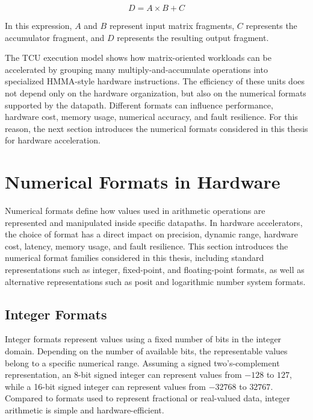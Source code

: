 \begin{equation}
D = A \times B + C
\label{eq:HMMA_mma}
\end{equation}

In this expression, $A$ and $B$ represent input matrix fragments, $C$ represents the accumulator fragment, and $D$ represents the resulting output fragment.

The TCU execution model shows how matrix-oriented workloads can be accelerated by grouping many multiply-and-accumulate operations into specialized HMMA-style hardware instructions. The efficiency of these units does not depend only on the hardware organization, but also on the numerical formats supported by the datapath. Different formats can influence performance, hardware cost, memory usage, numerical accuracy, and fault resilience. For this reason, the next section introduces the numerical formats considered in this thesis for hardware acceleration.


\section{Numerical Formats in Hardware}
\label{sec:numerical_formats_hardware}
Numerical formats define how values used in arithmetic operations are represented and manipulated inside specific datapaths. In hardware accelerators, the choice of format has a direct impact on precision, dynamic range, hardware cost, latency, memory usage, and fault resilience. This section introduces the numerical format families considered in this thesis, including standard representations such as integer, fixed-point, and floating-point formats, as well as alternative representations such as posit and logarithmic number system formats.

\subsection{Integer Formats}

Integer formats represent values using a fixed number of bits in the integer domain. Depending on the number of available bits, the representable values belong to a specific numerical range. Assuming a signed two's-complement representation, an 8-bit signed integer can represent values from $-128$ to $127$, while a 16-bit signed integer can represent values from $-32768$ to $32767$. Compared to formats used to represent fractional or real-valued data, integer arithmetic is simple and hardware-efficient.

